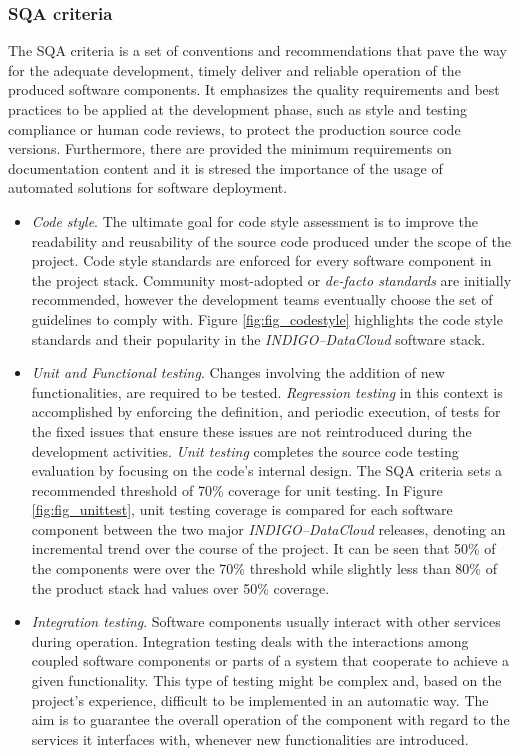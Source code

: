 \documentclass[journal]{IEEEtran}
\begin{document}
\subsubsection{SQA criteria}

The SQA criteria is a set of conventions and recommendations that pave the way for
the adequate development, timely deliver and reliable operation of the produced software components.
It emphasizes the quality requirements and best practices to be applied at the
development phase, such as style and testing compliance or human code reviews, to protect the
production source code versions. Furthermore, there are provided the minimum requirements on documentation content and it is stresed the importance of the usage of automated
solutions for software deployment.

\begin{itemize}
\item \textit{Code style}.
The ultimate goal for code style assessment is to improve the readability and reusability of the source code produced under the scope of the
project. Code style standards are enforced for every software component in the project stack. Community
most-adopted or \textit{de-facto standards} are initially recommended, however the development teams eventually
choose the set of guidelines to comply with.  Figure \ref{fig:fig_codestyle} highlights the code style standards and their popularity
in the {\sl INDIGO--DataCloud} software stack.

\item \textit{Unit and Functional testing}.
Changes involving the addition of new functionalities, are required to be tested. \textit{Regression
testing} in this context is accomplished by enforcing the definition, and periodic execution, of tests for the fixed issues that ensure these issues are not reintroduced during the development activities.
 \textit{Unit testing} completes the source code testing evaluation by
focusing on the code's internal design. The SQA criteria sets a recommended threshold of
70\% coverage for unit testing. In Figure \ref{fig:fig_unittest}, unit testing coverage is compared
for each software component between the two major {\sl INDIGO--DataCloud} releases, denoting an incremental
trend over the course of the project. It can be seen that 50\% of the components were over the
70\% threshold while slightly less than 80\% of the product stack had values over 50\% coverage.

\item \textit{Integration testing}. Software components usually interact with other services during
operation. Integration testing deals with the interactions among coupled software components or
parts of a system that cooperate to achieve a given functionality. This type of testing might be
complex and, based on the project's experience, difficult to be implemented in an automatic way. The aim is to
guarantee the overall operation of the component with regard to the services it interfaces with,
whenever new functionalities are introduced.


\end{itemize}
\end{document}
